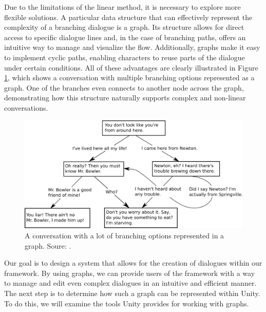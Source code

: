Due to the limitations of the linear method, it is necessary to explore more flexible solutions. A particular data structure that can effectively represent the complexity of a branching dialogue is a graph. Its structure allows for direct access to specific dialogue lines and, in the case of branching paths, offers an intuitive way to manage and visualize the flow. Additionally, graphs make it easy to implement cyclic paths, enabling characters to reuse parts of the dialogue under certain conditions. All of these advantages are clearly illustrated in Figure \ref{fig:DialogueGraph}, which shows a conversation with multiple branching options represented as a graph. One of the branches even connects to another node across the graph, demonstrating how this structure naturally supports complex and non-linear conversations.

\begin{figure}[H]
\centering
\includegraphics[width=.8\linewidth]{img/image_2025-06-02_133436738.png}
\caption{A conversation with a lot of branching options represented in a graph. Soure: \cite{wiki:DialogueGraph}.}
\label{fig:DialogueGraph}
\end{figure}

Our goal is to design a system that allows for the creation of dialogues within our framework. By using graphs, we can provide users of the framework with a way to manage and edit even complex dialogues in an intuitive and efficient manner. The next step is to determine how such a graph can be represented within Unity. To do this, we will examine the tools Unity provides for working with graphs. 

